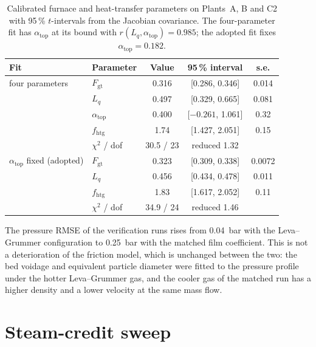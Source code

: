 \documentclass[final,3p,times]{elsarticle}
\begin{document}
\begin{table}[t]
\centering\footnotesize
\caption{Calibrated furnace and heat-transfer parameters on Plants~A, B and C2 with 95\,\% $t$-intervals from the Jacobian covariance. The four-parameter fit has $\alpha_{\mathrm{top}}$ at its bound with $r(L_q, \alpha_{\mathrm{top}}) = 0.985$; the adopted fit fixes $\alpha_{\mathrm{top}} = 0.182$.}
\label{tab:params}
\begin{tabular}{llccc}
\toprule
Fit & Parameter & Value & 95\,\% interval & s.e. \\
\midrule
four parameters & $F_{\mathrm{gt}}$ & 0.316 & [0.286, 0.346] & 0.014 \\
 & $L_q$ & 0.497 & [0.329, 0.665] & 0.081 \\
 & $\alpha_{\mathrm{top}}$ & 0.400 & [$-0.261$, 1.061] & 0.32 \\
 & $f_{\mathrm{htg}}$ & 1.74 & [1.427, 2.051] & 0.15 \\
 & $\chi^2$ / dof & 30.5 / 23 & reduced 1.32 & \\
\midrule
$\alpha_{\mathrm{top}}$ fixed (adopted) & $F_{\mathrm{gt}}$ & 0.323 & [0.309, 0.338] & 0.0072 \\
 & $L_q$ & 0.456 & [0.434, 0.478] & 0.011 \\
 & $f_{\mathrm{htg}}$ & 1.83 & [1.617, 2.052] & 0.11 \\
 & $\chi^2$ / dof & 34.9 / 24 & reduced 1.46 & \\
\bottomrule
\end{tabular}
\end{table}

The pressure RMSE of the verification runs rises from 0.04~bar with the Leva--Grummer configuration to 0.25~bar with the matched film coefficient. This is not a deterioration of the friction model, which is unchanged between the two: the bed voidage and equivalent particle diameter were fitted to the pressure profile under the hotter Leva--Grummer gas, and the cooler gas of the matched run has a higher density and a lower velocity at the same mass flow.

\section{Steam-credit sweep}
\label{sec:steamcredit}
\end{document}
